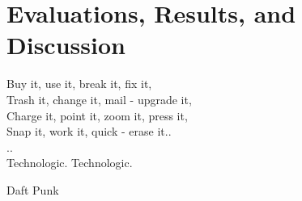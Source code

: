 \chapter{Evaluations, Results, and Discussion}
\label{cap:evaluations}
 
 \epigraph{
 	Buy it, use it, break it, fix it,\\
 	Trash it, change it, mail - upgrade it,\\
 	Charge it, point it, zoom it, press it,\\
 	Snap it, work it, quick - erase it..\\
 	..\\
 	Technologic. Technologic.}
 {Daft Punk}




